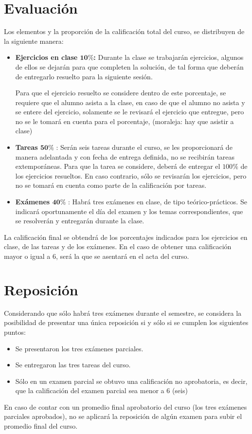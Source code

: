 \documentclass[12pt]{article}
\begin{document}
\section{Evaluación}
Los elementos y la proporción de la calificación total del curso, se distribuyen de la siguiente manera:
\begin{itemize}
\item \textbf{Ejercicios en clase $\mathbf{10\%}$:} Durante la clase se trabajarán ejercicios, algunos de ellos se dejarán para que completen la solución, de tal forma que deberán de entregarlo resuelto para la siguiente sesión.
\par
Para que el ejercicio resuelto se considere dentro de este porcentaje, se requiere que el alumno asista a la clase, en caso de que el alumno no asista y se entere del ejercicio, solamente se le revisará el ejercicio que entregue, pero no se le tomará en cuenta para el porcentaje, (moraleja: hay que asistir a clase) 
\item \textbf{Tareas $\mathbf{50\%}$} : Serán seis tareas durante el curso, se les proporcionará de manera adelantada y con fecha de entrega definida, no se recibirán tareas extemporáneas. Para que la tarea se considere, deberá de entregar el $100\%$ de los ejercicios resueltos. En caso contrario, sólo se revisarán los ejercicios, pero no se tomará en cuenta como parte de la calificación por tareas.
\item \textbf{Exámenes $\mathbf{40\%}$} : Habrá tres exámenes en clase, de tipo teórico-prácticos. Se indicará oportunamente el día del examen y los temas correspondientes, que se resolverán y entregarán durante la clase.
\end{itemize}
La calificación final se obtendrá de los porcentajes indicados para los ejercicios en clase, de las tareas y de los exámenes. En el caso de obtener una calificación mayor o igual a $6$, será la que se asentará en el acta del curso.
\section{Reposición}
Considerando que sólo habrá tres exámenes durante el semestre, se considera la posibilidad de presentar una única reposición si y sólo si se cumplen los siguientes puntos:
\begin{itemize}
\item Se presentaron los tres exámenes parciales.
\item Se entregaron las tres tareas del curso.
\item Sólo en un examen parcial se obtuvo una calificación no aprobatoria, es decir, que la calificación del examen parcial sea menor a $6$ (seis)
\end{itemize}
En caso de contar con un promedio final aprobatorio del curso (los tres exámenes parciales aprobados), no se aplicará la reposición de algún examen para subir el promedio final del curso.
\end{document}
